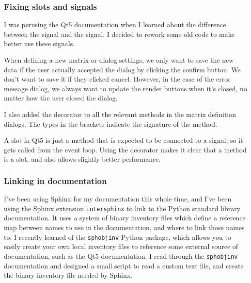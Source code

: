 \documentclass[../development.tex]{subfiles}
\begin{document}
\subsubsection{Fixing slots and signals\label{development:preparing-for-v0.2.1:fixing-slots-and-signals}}

I was perusing the Qt5 documentation when I learned about the difference between the  signal and the  signal. I decided to rework some old code to make better use these signals.

When defining a new matrix or dialog settings, we only want to save the new data if the user actually accepted the dialog by clicking the confirm button. We don't want to save it if they clicked cancel. However, in the case of the error message dialog, we always want to update the render buttons when it's closed, no matter how the user closed the dialog.


I also added the  decorator to all the relevant methods in the matrix definition dialogs. The types in the brackets indicate the signature of the method.

A slot in Qt5 is just a method that is expected to be connected to a signal, so it gets called from the event loop. Using the decorator makes it clear that a method is a slot, and also allows slightly better performance.


\subsubsection{Linking in documentation\label{development:preparing-for-v0.2.1:linking-in-documentation}}

I've been using Sphinx\cite{sphinx} for my documentation this whole time, and I've been using the Sphinx extension \texttt{intersphinx} to link to the Python standard library documentation. It uses a system of binary inventory files which define a reference map between names to use in the documentation, and where to link those names to. I recently learned of the \texttt{sphobjinv} Python package, which allows you to easily create your own local inventory files to reference some external source of documentation, such as the Qt5 documentation. I read through the \texttt{sphobjinv} documentation\cite{sphobjinv-2.2-docs} and designed a small script to read a custom text file, and create the binary inventory file needed by Sphinx.
\end{document}
